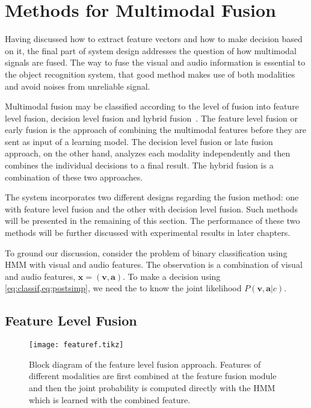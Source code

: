 \documentclass[12pt,final,twoside]{report}
\begin{document}
\section{Methods for Multimodal Fusion}
Having discussed how to extract feature vectors and how to make decision based on it, the final part of system design addresses the question of how multimodal signals are fused. The way to fuse the visual and audio information is essential to the object recognition system, that good method makes use of both modalities and avoid noises from unreliable signal.

Multimodal fusion may be classified according to the level of fusion into feature level fusion, decision level fusion and hybrid fusion~\cite{atrey_multimodal_2010}. The feature level fusion or early fusion is the approach of combining the multimodal features before they are sent as input of a learning model. The decision level fusion or late fusion approach, on the other hand, analyzes each modality independently and then combines the individual decisions to a final result. The hybrid fusion is a combination of these two approaches.

The system incorporates two different designs regarding the fusion method: one with feature level fusion and the other with decision level fusion. Such methods will be presented in the remaining of this section. The performance of these two methods will be further discussed with experimental results in later chapters.

To ground our discussion, consider the problem of binary classification using HMM with visual and audio features. The observation is a combination of visual and audio features, $\mathbf{x} = (\mathbf{v}, \mathbf{a})$. To make a decision using \cref{eq:classif,eq:postsimp}, we need the to know the joint likelihood $P(\mathbf{v},\mathbf{a}|c)$.

\subsection{Feature Level Fusion}
\begin{figure}[t]
  \centering
  \texttt{[image: featuref.tikz]}
  \caption[Block diagram of the feature level fusion approach.]{Block diagram of the feature level fusion approach. Features of different modalities are first combined at the feature fusion module and then the joint probability is computed directly with the HMM which is learned with the combined feature.}
  \label{fig:featuref}
\end{figure}
\end{document}
